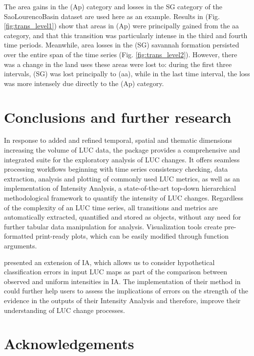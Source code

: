 The area gains in the (Ap) category and losses in the SG category of the
SaoLourencoBasin dataset are used here as an example. Results in (Fig.
\ref{fig:trans_level1}) show that areas in (Ap) were principally gained
from the aa category, and that this transition was particularly intense
in the third and fourth time periods. Meanwhile, area losses in the (SG)
savannah formation persisted over the entire span of the time series
(Fig. \ref{fig:trans_level2}). However, there was a change in the land
uses these areas were lost to: during the first three intervals, (SG) was
lost principally to (aa), while in the last time interval, the loss was
more intensely due directly to the (Ap) category.

\hypertarget{conclusions-and-further-research}{%
\section{Conclusions and further
research}\label{conclusions-and-further-research}}

In response to added and refined temporal, spatial and thematic
dimensions increasing the volume of LUC data, the  package
provides a comprehensive and integrated suite for the exploratory
analysis of LUC changes. It offers seamless processing workflows
beginning with time series consistency checking, data extraction,
analysis and plotting of commonly used LUC metrics, as well as an
implementation of Intensity Analysis, a state-of-the-art top-down
hierarchical methodological framework to quantify the intensity of LUC
changes. Regardless of the complexity of an LUC time series, all
transitions and metrics are automatically extracted, quantified and
stored as objects, without any need for further tabular data
manipulation for analysis. Visualization tools create pre-formatted
print-ready plots, which can be easily modified through function
arguments.

\citet{Aldwaik2013} presented an extension of IA, which allows us to
consider hypothetical classification errors in input LUC maps as part of
the comparison between observed and uniform intensities in IA. The
implementation of their method in  could further help users to
assess the implications of errors on the strength of the evidence in the
outputs of their Intensity Analysis and therefore, improve their
understanding of LUC change processes.

\hypertarget{acknowledgements}{%
\section{Acknowledgements}\label{acknowledgements}}


